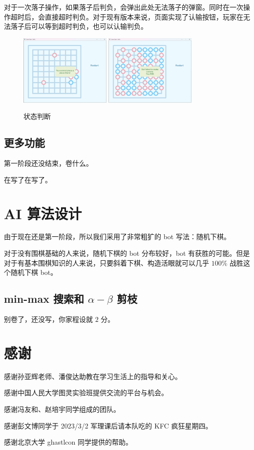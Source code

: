 \documentclass{noithesis}
\begin{document}
	对于一次落子操作，如果落子后判负，会弹出此处无法落子的弹窗。同时在一次操作超时后，会直接超时判负。对于现有版本来说，页面实现了认输按钮，玩家在无法落子后可以等到超时判负，也可以认输判负。
	
	\begin{figure}[!htb]{
			\centering
			\includegraphics[width=0.4\textwidth]{img/tip.png}
			\includegraphics[width=0.4\textwidth]{img/win.png}
			\caption{状态判断}
		}
	\end{figure}
	
	\subsection{更多功能}
	
	第一阶段还没结束，卷什么。
	
	在写了在写了。
	
	\section{AI 算法设计}
	
	由于现在还是第一阶段，所以我们采用了非常粗犷的 bot 写法：随机下棋。
	
	对于没有围棋基础的人来说，随机下棋的 bot 分布较好，bot 有获胜的可能。但是对于有基本围棋知识的人来说，只要斜着下棋、构造活眼就可以几乎 $100\%$ 战胜这个随机下棋 bot。
	
	\subsection{min-max 搜索和 $\alpha-\beta$ 剪枝}
	
	别卷了，还没写，你家程设就 $2$ 分。
	
	\section{感谢}
	
	感谢孙亚辉老师、潘俊达助教在学习生活上的指导和关心。
	
	感谢中国人民大学图灵实验班提供交流的平台与机会。
	
	感谢冯友和、赵培宇同学组成的团队。
	
	感谢彭文博同学于 2023/3/2 军理课后请本队吃的 KFC 疯狂星期四。
	
	感谢北京大学 ghastlcon 同学提供的帮助。
	
\end{document}
